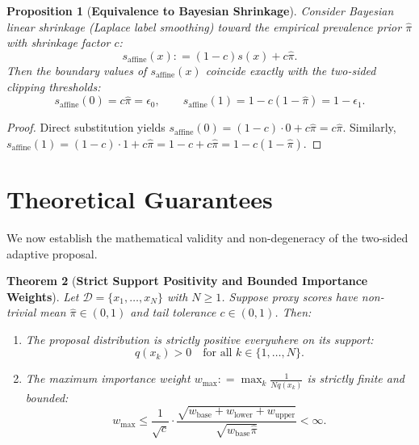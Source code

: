 \documentclass[11pt,a4paper]{article}
\newcommand{\coloneqq}{\mathrel{\mathop:}=}
\newcommand{\D}{\mathcal{D}}
\newtheorem{theorem}{Theorem}
\newtheorem{proposition}[theorem]{Proposition}
\begin{document}
\begin{proposition}[\textbf{Equivalence to Bayesian Shrinkage}]\label{prop:bayesian_equivalence}
Consider Bayesian linear shrinkage (Laplace label smoothing) toward the empirical prevalence prior $\hat{\pi}$ with shrinkage factor $c$:
\begin{equation}
s_{\text{affine}}(x) \coloneqq (1 - c) s(x) + c \hat{\pi}.
\end{equation}
Then the boundary values of $s_{\text{affine}}(x)$ coincide exactly with the two-sided clipping thresholds:
\begin{equation}
s_{\text{affine}}(0) = c \hat{\pi} = \epsilon_0, \qquad s_{\text{affine}}(1) = 1 - c(1 - \hat{\pi}) = 1 - \epsilon_1.
\end{equation}
\end{proposition}

\begin{proof}
Direct substitution yields $s_{\text{affine}}(0) = (1 - c)\cdot 0 + c\hat{\pi} = c\hat{\pi}$. Similarly, $s_{\text{affine}}(1) = (1 - c)\cdot 1 + c\hat{\pi} = 1 - c + c\hat{\pi} = 1 - c(1 - \hat{\pi})$.
\end{proof}

\section{Theoretical Guarantees}

We now establish the mathematical validity and non-degeneracy of the two-sided adaptive proposal.

\begin{theorem}[\textbf{Strict Support Positivity and Bounded Importance Weights}]\label{thm:positivity}
Let $\D = \{x_1, \dots, x_N\}$ with $N \ge 1$. Suppose proxy scores have non-trivial mean $\hat{\pi} \in (0, 1)$ and tail tolerance $c \in (0, 1)$.
Then:
\begin{enumerate}[leftmargin=*]
    \item The proposal distribution is strictly positive everywhere on its support:
    \begin{equation}
    q(x_k) > 0 \quad \text{for all } k \in \{1, \dots, N\}.
    \end{equation}
    \item The maximum importance weight $w_{\max} \coloneqq \max_{k} \frac{1}{N q(x_k)}$ is strictly finite and bounded:
    \begin{equation}
    w_{\max} \le \frac{1}{\sqrt{c}} \cdot \frac{\sqrt{w_{\text{base}} + w_{\text{lower}} + w_{\text{upper}}}}{\sqrt{w_{\text{base}} \hat{\pi}}} < \infty.
    \end{equation}
\end{enumerate}
\end{theorem}
\end{document}
